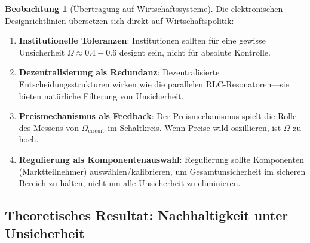 \documentclass[a4paper,12pt,twoside]{report}
\theoremstyle{definition}
\newtheorem{beobachtung}{Beobachtung}
\begin{document}
\begin{beobachtung}[Übertragung auf Wirtschaftssysteme]

Die elektronischen Designrichtlinien übersetzen sich direkt auf Wirtschaftspolitik:

\begin{enumerate}
    \item \textbf{Institutionelle Toleranzen}: Institutionen sollten für eine gewisse Unsicherheit $\Omega \approx 0.4-0.6$ designt sein, nicht für absolute Kontrolle.
    
    \item \textbf{Dezentralisierung als Redundanz}: Dezentralisierte Entscheidungsstrukturen wirken wie die parallelen RLC-Resonatoren—sie bieten natürliche Filterung von Unsicherheit.
    
    \item \textbf{Preismechanismus als Feedback}: Der Preismechanismus spielt die Rolle des Messens von $\Omega_{\text{circuit}}$ im Schaltkreis. Wenn Preise wild oszillieren, ist $\Omega$ zu hoch.
    
    \item \textbf{Regulierung als Komponentenauswahl}: Regulierung sollte Komponenten (Marktteilnehmer) auswählen/kalibrieren, um Gesamtunsicherheit im sicheren Bereich zu halten, nicht um alle Unsicherheit zu eliminieren.
\end{enumerate}

\end{beobachtung}

\subsection{Theoretisches Resultat: Nachhaltigkeit unter Unsicherheit}
\end{document}
